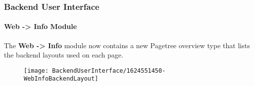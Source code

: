 %

\begin{frame}[fragile]
	\frametitle{Backend User Interface}
	\framesubtitle{Web -> Info Module}

	The \textbf{Web -> Info} module now contains a new Pagetree overview type
	that lists the backend layouts used on each page.

	\begin{figure}
		\texttt{[image: BackendUserInterface/1624551450-WebInfoBackendLayout]}
	\end{figure}

\end{frame}

